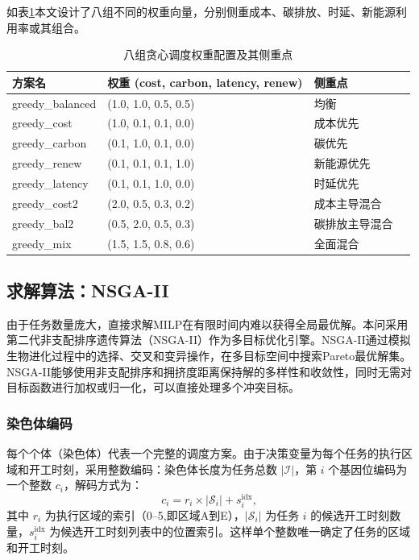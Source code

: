 \documentclass[UTF8,a4paper,zihao=-4]{ctexart}
\begin{document}
如表\ref{tab:greedy_weights}本文设计了八组不同的权重向量，分别侧重成本、碳排放、时延、新能源利用率或其组合。
\begin{table}[htbp]
\centering
\small
\caption{八组贪心调度权重配置及其侧重点}
\label{tab:greedy_weights}
\begin{tabular}{llll}
\toprule
\textbf{方案名} & \textbf{权重 (cost, carbon, latency, renew)} & \textbf{侧重点} \\
\midrule
greedy\_balanced & (1.0, 1.0, 0.5, 0.5) & 均衡 \\
greedy\_cost     & (1.0, 0.1, 0.1, 0.0) & 成本优先 \\
greedy\_carbon   & (0.1, 1.0, 0.1, 0.0) & 碳优先 \\
greedy\_renew    & (0.1, 0.1, 0.1, 1.0) & 新能源优先 \\
greedy\_latency  & (0.1, 0.1, 1.0, 0.0) & 时延优先 \\
greedy\_cost2    & (2.0, 0.5, 0.3, 0.2) & 成本主导混合 \\
greedy\_bal2     & (0.5, 2.0, 0.5, 0.3) & 碳排放主导混合 \\
greedy\_mix      & (1.5, 1.5, 0.8, 0.6) & 全面混合 \\
\bottomrule
\end{tabular}
\end{table}
\subsection{求解算法：NSGA-II}

由于任务数量庞大，直接求解MILP在有限时间内难以获得全局最优解。本问采用第二代非支配排序遗传算法（NSGA-II）作为多目标优化引擎\cite{deb2002nsga,公茂果2009进化多目标}。NSGA-II通过模拟生物进化过程中的选择、交叉和变异操作，在多目标空间中搜索Pareto最优解集。NSGA-II能够使用非支配排序和拥挤度距离保持解的多样性和收敛性，同时无需对目标函数进行加权或归一化，可以直接处理多个冲突目标。

\subsubsection{染色体编码}

每个个体（染色体）代表一个完整的调度方案。由于决策变量为每个任务的执行区域和开工时刻，采用整数编码：染色体长度为任务总数 $|\mathcal{I}|$，第 $i$ 个基因位编码为一个整数 $c_i$，解码方式为：
\[
c_i = r_i \times |\mathcal{S}_i| + s_i^{\text{idx}},
\]
其中 $r_i$ 为执行区域的索引（0--5,即区域A到E），$|\mathcal{S}_i|$ 为任务 $i$ 的候选开工时刻数量，$s_i^{\text{idx}}$ 为候选开工时刻列表中的位置索引。这样单个整数唯一确定了任务的区域和开工时刻。
\end{document}
